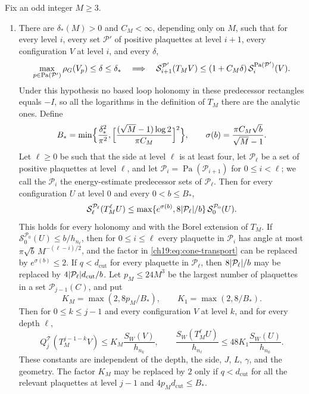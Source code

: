 \begin{theorem}\label{ch19:thm:classical-source-payment}
Fix an odd integer $M\ge3$.
\begin{enumerate}
\item[(a)] There are $\delta_*(M)>0$ and $C_M<\infty$, depending only on $M$, such that for every level $i$, every set $\mathcal P'$ of positive plaquettes at level $i+1$, every configuration $V$ at level $i$, and every $\delta$,
\[
 \max_{p\in\operatorname{Pa}(\mathcal P')}\rho_G(V_p)\le\delta\le\delta_*
 \quad\Longrightarrow\quad
 \mathcal S_{i+1}^{\mathcal P'}(T_MV)\le(1+C_M\delta)\,\mathcal S_i^{\operatorname{Pa}(\mathcal P')}(V).
\]
Under this hypothesis no based loop holonomy in these predecessor rectangles equals $-I$, so all the logarithms in the definition of $T_M$ there are the analytic ones. Define
\[
 B_*=\min\Bigl\{\frac{\delta_*^2}{\pi^2},\Bigl[\frac{(\sqrt M-1)\log2}{\pi C_M}\Bigr]^2\Bigr\},
 \qquad\sigma(b)=\frac{\pi C_M\sqrt b}{\sqrt M-1}.
\]
Let $\ell\ge0$ be such that the side at level $\ell$ is at least four, let $\mathcal P_\ell$ be a set of positive plaquettes at level $\ell$, and let $\mathcal P_i=\operatorname{Pa}(\mathcal P_{i+1})$ for $0\le i<\ell$; we call the $\mathcal P_i$ the energy-estimate predecessor sets of $\mathcal P_\ell$. Then for every configuration $U$ at level $0$ and every $0<b\le B_*$,
\begin{equation}\label{ch19:eq:cone-transport}
 \mathcal S_\ell^{\mathcal P_\ell}(T_M^\ell U)\le\max\{e^{\sigma(b)},8\lvert \mathcal P_\ell\rvert/b\}\,\mathcal S_0^{\mathcal P_0}(U).
\end{equation}
This holds for every holonomy and with the Borel extension of $T_M$. If $\mathcal S_0^{\mathcal P_0}(U)\le b/h_{n_\ell}$, then for $0\le i\le\ell$ every plaquette in $\mathcal P_i$ has angle at most $\pi\sqrt b\,M^{-(\ell-i)/2}$, and the factor in \eqref{ch19:eq:cone-transport} can be replaced by $e^{\sigma(b)}\le2$. If $q<d_{\mathrm{cut}}$ for every plaquette in $\mathcal P_\ell$, then $8\lvert \mathcal P_\ell\rvert/b$ may be replaced by $4\lvert \mathcal P_\ell\rvert d_{\mathrm{cut}}/b$. Let $p_M\le24M^3$ be the largest number of plaquettes in a set $\mathcal P_{j-1}(C)$, and put
\[
 K_M=\max(2,8p_M/B_*),\qquad K_1=\max(2,8/B_*).
\]
Then for $0\le k\le j-1$ and every configuration $V$ at level $k$, and for every depth $\ell$,
\[
 Q_j^{\mathcal T}(T_M^{j-1-k}V)\le K_M\frac{S_W(V)}{h_{n_k}},\qquad
 \frac{S_W(T_M^\ell U)}{h_{n_\ell}}\le48K_1\frac{S_W(U)}{h_{n_0}}.
\]
These constants are independent of the depth, the side, $J$, $L$, $\gamma$, and the geometry. The factor $K_M$ may be replaced by $2$ only if $q<d_{\mathrm{cut}}$ for all the relevant plaquettes at level $j-1$ and $4p_Md_{\mathrm{cut}}\le B_*$.


\end{enumerate}
\end{theorem}
